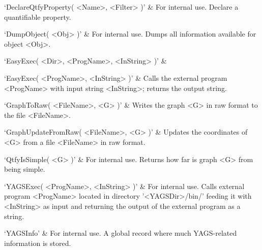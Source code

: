 
\beginitems
`DeclareQtfyProperty( <Name>, <Filter> )' & 
For internal use. Declare a quantifiable property.

`DumpObject( <Obj> )' & 
For internal use. Dumps  all information available for object <Obj>.

`EasyExec( <Dir>, <ProgName>, <InString> )' & 

`EasyExec( <ProgName>, <InString> )' & 
Calls the external program <ProgName> with input string <InString>; returns the output string.

`GraphToRaw( <FileName>, <G> )' & 
Writes the graph <G> in raw format to the file  <FileName>.

`GraphUpdateFromRaw( <FileName>, <G> )' & 
Updates  the  coordinates  of  <G>  from  a file <FileName> in raw format.

`QtfyIsSimple( <G> )' & 
For internal use. Returns how far is graph <G> from being simple.

`YAGSExec( <ProgName>, <InString> )' & 
For  internal  use.  Calls  external  program  <ProgName> located in directory
'<YAGSDir>/bin/'  feeding  it with <InString> as input and returning  the
output  of  the  external  program  as a string.

`YAGSInfo' &
For internal use. A global record where much YAGS-related information is stored.
\enditems

%
%
%
%


